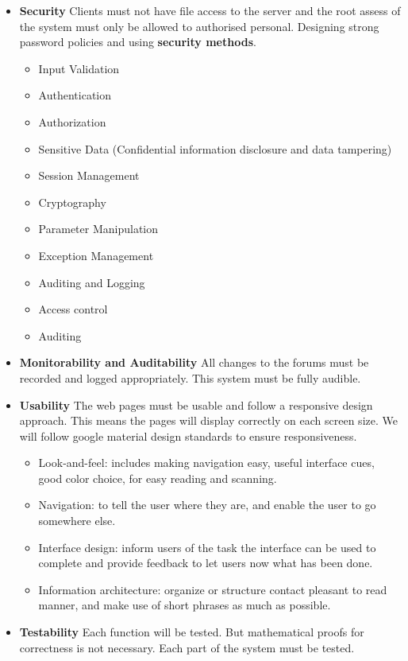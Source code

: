 \begin{itemize}
	\item \textbf{Security}
		Clients must not have file access to the server and the root assess of the system must only be allowed to authorised personal. Designing strong password policies and using \textbf{security methods}.
		\begin{itemize}
			\item Input Validation
			\item Authentication
			\item Authorization
			\item Sensitive Data (Confidential information disclosure and data tampering)
			\item Session Management
			\item Cryptography
			\item Parameter Manipulation
			\item Exception Management
			\item Auditing and Logging
			\item Access control
			\item Auditing
		\end{itemize}
	\item \textbf{Monitorability and Auditability}
		All changes to the forums must be recorded and logged appropriately. This system must be fully audible. 
		\item \textbf{Usability}
		The web pages must be usable and follow a responsive design approach. This means the pages will display correctly on each screen size. We will follow google material design standards to ensure responsiveness.
		\begin{itemize}
			\item Look-and-feel: includes making navigation easy, useful interface cues, good color choice, for easy reading and scanning.
			\item Navigation: to tell the user where they are, and enable the user to go somewhere else.
			\item Interface design: inform users of the task the interface can be used to complete and provide feedback to let users now what has been done.
			\item Information architecture: organize or structure contact pleasant to read manner, and make use of short phrases as much as possible.
		\end{itemize}
	\item \textbf{Testability}
		Each function will be tested. But mathematical proofs for correctness is not necessary. Each part of the system must be tested. 

\end{itemize}
